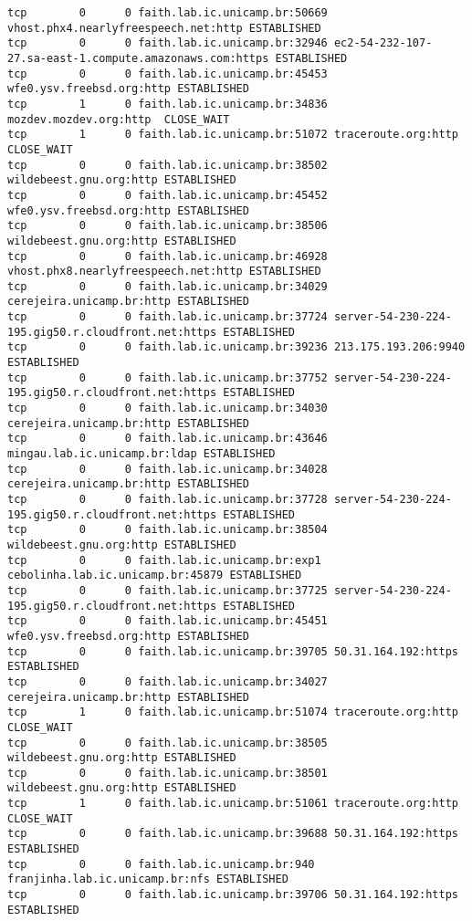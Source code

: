 \documentclass[a4paper,10pt,oneside,final,titlepage,onecolumn]{article}
\begin{document}
\begin{lstlisting}
tcp        0      0 faith.lab.ic.unicamp.br:50669 vhost.phx4.nearlyfreespeech.net:http ESTABLISHED
tcp        0      0 faith.lab.ic.unicamp.br:32946 ec2-54-232-107-27.sa-east-1.compute.amazonaws.com:https ESTABLISHED
tcp        0      0 faith.lab.ic.unicamp.br:45453 wfe0.ysv.freebsd.org:http ESTABLISHED
tcp        1      0 faith.lab.ic.unicamp.br:34836 mozdev.mozdev.org:http  CLOSE_WAIT 
tcp        1      0 faith.lab.ic.unicamp.br:51072 traceroute.org:http     CLOSE_WAIT 
tcp        0      0 faith.lab.ic.unicamp.br:38502 wildebeest.gnu.org:http ESTABLISHED
tcp        0      0 faith.lab.ic.unicamp.br:45452 wfe0.ysv.freebsd.org:http ESTABLISHED
tcp        0      0 faith.lab.ic.unicamp.br:38506 wildebeest.gnu.org:http ESTABLISHED
tcp        0      0 faith.lab.ic.unicamp.br:46928 vhost.phx8.nearlyfreespeech.net:http ESTABLISHED
tcp        0      0 faith.lab.ic.unicamp.br:34029 cerejeira.unicamp.br:http ESTABLISHED
tcp        0      0 faith.lab.ic.unicamp.br:37724 server-54-230-224-195.gig50.r.cloudfront.net:https ESTABLISHED
tcp        0      0 faith.lab.ic.unicamp.br:39236 213.175.193.206:9940    ESTABLISHED
tcp        0      0 faith.lab.ic.unicamp.br:37752 server-54-230-224-195.gig50.r.cloudfront.net:https ESTABLISHED
tcp        0      0 faith.lab.ic.unicamp.br:34030 cerejeira.unicamp.br:http ESTABLISHED
tcp        0      0 faith.lab.ic.unicamp.br:43646 mingau.lab.ic.unicamp.br:ldap ESTABLISHED
tcp        0      0 faith.lab.ic.unicamp.br:34028 cerejeira.unicamp.br:http ESTABLISHED
tcp        0      0 faith.lab.ic.unicamp.br:37728 server-54-230-224-195.gig50.r.cloudfront.net:https ESTABLISHED
tcp        0      0 faith.lab.ic.unicamp.br:38504 wildebeest.gnu.org:http ESTABLISHED
tcp        0      0 faith.lab.ic.unicamp.br:exp1 cebolinha.lab.ic.unicamp.br:45879 ESTABLISHED
tcp        0      0 faith.lab.ic.unicamp.br:37725 server-54-230-224-195.gig50.r.cloudfront.net:https ESTABLISHED
tcp        0      0 faith.lab.ic.unicamp.br:45451 wfe0.ysv.freebsd.org:http ESTABLISHED
tcp        0      0 faith.lab.ic.unicamp.br:39705 50.31.164.192:https     ESTABLISHED
tcp        0      0 faith.lab.ic.unicamp.br:34027 cerejeira.unicamp.br:http ESTABLISHED
tcp        1      0 faith.lab.ic.unicamp.br:51074 traceroute.org:http     CLOSE_WAIT 
tcp        0      0 faith.lab.ic.unicamp.br:38505 wildebeest.gnu.org:http ESTABLISHED
tcp        0      0 faith.lab.ic.unicamp.br:38501 wildebeest.gnu.org:http ESTABLISHED
tcp        1      0 faith.lab.ic.unicamp.br:51061 traceroute.org:http     CLOSE_WAIT 
tcp        0      0 faith.lab.ic.unicamp.br:39688 50.31.164.192:https     ESTABLISHED
tcp        0      0 faith.lab.ic.unicamp.br:940 franjinha.lab.ic.unicamp.br:nfs ESTABLISHED
tcp        0      0 faith.lab.ic.unicamp.br:39706 50.31.164.192:https     ESTABLISHED
\end{lstlisting}
\end{document}
